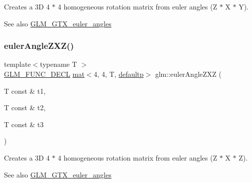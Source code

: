 Creates a 3D 4 $\ast$ 4 homogeneous rotation matrix from euler angles (Z $\ast$ X $\ast$ Y). \begin{DoxySeeAlso}{See also}
\mbox{\hyperlink{group__gtx__euler__angles}{G\+L\+M\+\_\+\+G\+T\+X\+\_\+euler\+\_\+angles}} 
\end{DoxySeeAlso}
\mbox{\label{group__gtx__euler__angles_ga178f966c52b01e4d65e31ebd007e3247}} 
\subsubsection{\texorpdfstring{euler\+Angle\+Z\+X\+Z()}{eulerAngleZXZ()}}
{\footnotesize\ttfamily template$<$typename T $>$ \\
\mbox{\hyperlink{setup_8hpp_ab2d052de21a70539923e9bcbf6e83a51}{G\+L\+M\+\_\+\+F\+U\+N\+C\+\_\+\+D\+E\+CL}} \mbox{\hyperlink{structglm_1_1mat}{mat}}$<$4, 4, T, \mbox{\hyperlink{namespaceglm_a36ed105b07c7746804d7fdc7cc90ff25a9d21ccd8b5a009ec7eb7677befc3bf51}{defaultp}}$>$ glm\+::euler\+Angle\+Z\+XZ (\begin{DoxyParamCaption}\item[{T const \&}]{t1,  }\item[{T const \&}]{t2,  }\item[{T const \&}]{t3 }\end{DoxyParamCaption})}

Creates a 3D 4 $\ast$ 4 homogeneous rotation matrix from euler angles (Z $\ast$ X $\ast$ Z). \begin{DoxySeeAlso}{See also}
\mbox{\hyperlink{group__gtx__euler__angles}{G\+L\+M\+\_\+\+G\+T\+X\+\_\+euler\+\_\+angles}} 
\end{DoxySeeAlso}
\mbox{\label{group__gtx__euler__angles_ga400b2bd5984999efab663f3a68e1d020}} 
